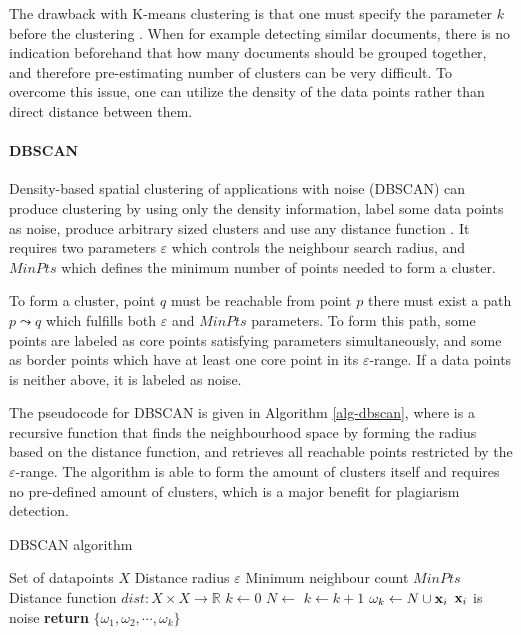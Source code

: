 The drawback with K-means clustering is that one must specify the parameter $k$ before the clustering \cite{hastie_09_elements-of.statistical-learning}. When for example detecting similar documents, there is no indication beforehand that how many documents should be grouped together, and therefore pre-estimating number of clusters can be very difficult. To overcome this issue, one can utilize the density of the data points rather than direct distance between them.

\paragraph{DBSCAN}

Density-based spatial clustering of applications with noise (DBSCAN) can produce clustering by using only the density information, label some data points as noise, produce arbitrary sized clusters and use any distance function \cite{Ester:1996:DAD:3001460.3001507}. It requires two parameters $\varepsilon$ which controls the neighbour search radius, and $MinPts$ which defines the minimum number of points needed to form a cluster. 

To form a cluster, point $q$ must be reachable from point $p$ \ie there must exist a path $p \leadsto q$ which fulfills both $\varepsilon$ and $MinPts$ parameters. To form this path, some points are labeled as core points satisfying parameters simultaneously, and some as border points which have at least one core point in its $\varepsilon$-range. If a data points is neither above, it is labeled as noise.


The pseudocode for DBSCAN is given in Algorithm \ref{alg-dbscan}, where  is a recursive function that finds the neighbourhood space by forming the radius based on the distance function, and retrieves all reachable points restricted by the $\varepsilon$-range. The algorithm is able to form the amount of clusters itself and requires no pre-defined amount of clusters, which is a major benefit for plagiarism detection.

\begin{algorithm}[ht]
\caption{DBSCAN algorithm \cite{Ester:1996:DAD:3001460.3001507, Schubert:2017:DRR:3129336.3068335}}
\label{alg-dbscan}
\begin{algorithmic}

\Require Set of datapoints $X$
\Require Distance radius $\varepsilon$
\Require Minimum neighbour count $MinPts$
\Require Distance function $dist: X \times X \rightarrow \mathbb{R}$
   \State $k \gets 0$
    \State $N \gets $ 
        \State $k \gets k + 1$
        \State $\omega_k \gets N \cup \mathbf{x}_i$
    \Else
        \State $\mathbf{x}_i$ is noise
    \EndIf
   \EndFor
   \State \textbf{return} $\{\omega_1, \omega_2, \cdots, \omega_k\}$
\EndProcedure

\end{algorithmic}
\end{algorithm}


